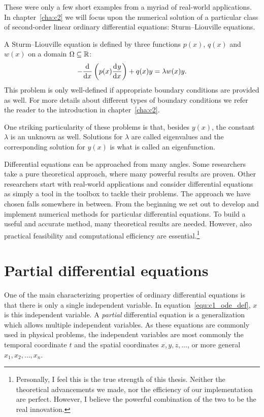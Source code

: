 These were only a few short examples from a myriad of real-world applications. In chapter~\ref{cha:c2} we will focus upon the numerical solution of a particular class of second-order linear ordinary differential equations: Sturm--Liouville equations.

A Sturm--Liouville equation is defined by three functions $p(x)$, $q(x)$ and $w(x)$ on a domain $\Omega \subseteq \mathbb{R}$:
$$
    -{\dv[]{}{x}}\left(p(x) \dv[]{y}{x}\right) + q(x) y = \lambda w(x) y\text{.}
$$
This problem is only well-defined if appropriate boundary conditions are provided as well. For more details about different types of boundary conditions we refer the reader to the introduction in chapter~\ref{cha:c2}.

One striking particularity of these problems is that, besides $y(x)$, the constant $\lambda$ is an unknown as well. Solutions for $\lambda$ are called eigenvalues and the corresponding solution for $y(x)$ is what is called an eigenfunction.

Differential equations can be approached from many angles. Some researchers take a pure theoretical approach, where many powerful results are proven. Other researchers start with real-world applications and consider differential equations as simply a tool in the toolbox to tackle their problems. The approach we have chosen falls somewhere in between. From the beginning we set out to develop and implement numerical methods for particular differential equations. To build a useful and accurate method, many theoretical results are needed. However, also practical feasibility and computational efficiency are essential.\footnote{Personally, I feel this is the true strength of this thesis. Neither the theoretical advancements we made, nor the efficiency of our implementation are perfect. However, I believe the powerful combination of the two to be the real innovation.}


\section{Partial differential equations}

One of the main characterizing properties of ordinary differential equations is that there is only a single independent variable. In equation~\eqref{equ:c1_ode_def}, $x$ is this independent variable. A \emph{partial} differential equation is a generalization which allows multiple independent variables. As these equations are commonly used in physical problems, the independent variables are most commonly the temporal coordinate $t$ and the spatial coordinates $x, y, z, \dots$, or more general $x_1, x_2, \dots, x_n$.

